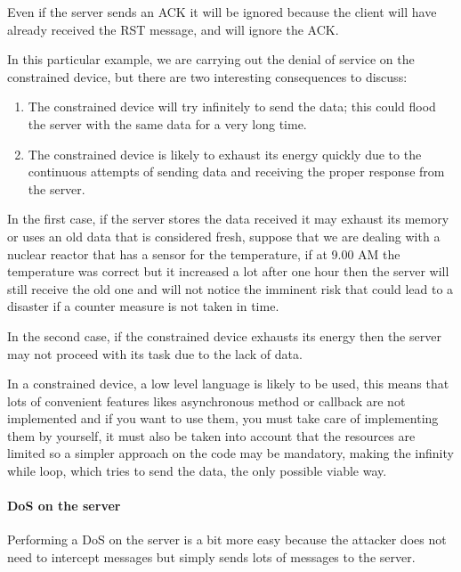 	Even if the server sends an ACK it will be ignored because the client will have already received the RST message, and will ignore the ACK.\newline
	
	In this particular example, we are carrying out the denial of service on the constrained device, but there are two interesting consequences to discuss:
	\begin{enumerate}
		\item The constrained device will try infinitely to send the data; this could flood the server with the same data for a very long time.
		\item The constrained device is likely to exhaust its energy quickly due to the continuous attempts of sending data and receiving the proper response from the server.
	\end{enumerate}

	In the first case, if the server stores the data received it may exhaust its memory or uses an old data that is considered fresh, suppose that we are dealing with a nuclear reactor that has a sensor for the temperature, if at 9.00 AM the temperature was correct but it increased a lot after one hour then the server will still receive the old one and will not notice the imminent risk that could lead to a disaster if a counter measure is not taken in time.\newline
	
	In the second case, if the constrained device exhausts its energy then the server may not proceed with its task due to the lack of data.\newline
	
	In a constrained device, a low level language is likely to be used, this means that lots of convenient features likes asynchronous method or callback are not implemented and if you want to use them, you must take care of implementing them by yourself, it must also be taken into account that the resources are limited so a simpler approach on the code may be mandatory, making the infinity while loop, which tries to send the data, the only possible viable way.\newline
	
	\paragraph{DoS on the server}
	Performing a DoS on the server is a bit more easy because the attacker does not need to intercept messages but simply sends lots of messages to the server.\newline
	
